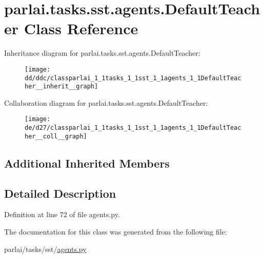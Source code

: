 \hypertarget{classparlai_1_1tasks_1_1sst_1_1agents_1_1DefaultTeacher}{}\section{parlai.\+tasks.\+sst.\+agents.\+Default\+Teacher Class Reference}
\label{classparlai_1_1tasks_1_1sst_1_1agents_1_1DefaultTeacher}


Inheritance diagram for parlai.\+tasks.\+sst.\+agents.\+Default\+Teacher\+:\nopagebreak
\begin{figure}[H]
\begin{center}
\leavevmode
\texttt{[image: dd/ddc/classparlai\_1\_1tasks\_1\_1sst\_1\_1agents\_1\_1DefaultTeacher\_\_inherit\_\_graph]}
\end{center}
\end{figure}


Collaboration diagram for parlai.\+tasks.\+sst.\+agents.\+Default\+Teacher\+:\nopagebreak
\begin{figure}[H]
\begin{center}
\leavevmode
\texttt{[image: de/d27/classparlai\_1\_1tasks\_1\_1sst\_1\_1agents\_1\_1DefaultTeacher\_\_coll\_\_graph]}
\end{center}
\end{figure}
\subsection*{Additional Inherited Members}


\subsection{Detailed Description}


Definition at line 72 of file agents.\+py.



The documentation for this class was generated from the following file\+:\begin{DoxyCompactItemize}
\item 
parlai/tasks/sst/\hyperlink{parlai_2tasks_2sst_2agents_8py}{agents.\+py}\end{DoxyCompactItemize}
